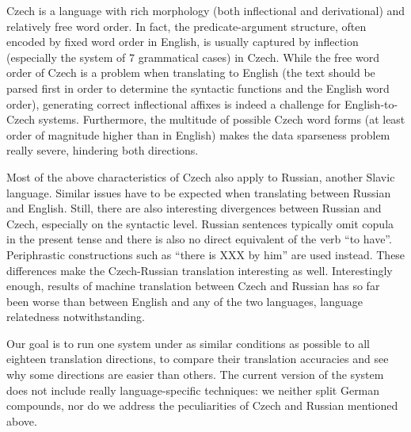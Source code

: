 \documentclass[11pt,letterpaper]{article}
\begin{document}
Czech is a language with rich morphology (both inflectional and derivational) and relatively free word order.
In fact, the predicate-argument structure, often encoded by fixed word order in English, is usually captured by inflection (especially the system of 7 grammatical cases) in Czech.
While the free word order of Czech is a problem when translating to English
(the text should be parsed first in order to determine the syntactic functions
and the English word order),
generating correct inflectional affixes is indeed a challenge for English-to-Czech systems.
Furthermore, the multitude of possible Czech word forms (at least order of magnitude higher than in English) makes the data sparseness problem really severe, hindering both directions.

Most of the above characteristics of Czech also apply to Russian, another Slavic language.
Similar issues have to be expected when translating between Russian and English.
Still, there are also interesting divergences between Russian and Czech, especially
on the syntactic level. Russian sentences typically omit copula in the present tense
and there is also no
direct equivalent of the verb ``to have''. Periphrastic constructions such as
``there is XXX by him'' are used instead. These differences make the Czech-Russian
translation interesting as well. Interestingly enough, results of machine translation between Czech and Russian has so far been worse than between English and any of the two languages, language relatedness notwithstanding.

\begin{comment}
There are numerous ways how these issues could be addressed.
For instance, parsing and syntax-aware reordering of the source-language sentences can help with the word order differences (same goal could be achieved by a reordering model or a synchronous context-free grammar in a hierarchical system).
Factored translation, a secondary language model of morphological tags or even a morphological generator are some of the possible solutions to the poor-to-rich translation issues.
\end{comment}

Our goal is to run one system under as similar conditions as possible
to all eighteen translation directions,
to compare their translation accuracies and see why some directions are easier than others.
The current version of the system does not include really language-specific techniques:
we neither split German compounds, nor do we address the peculiarities of Czech and Russian
mentioned above.
\end{document}

